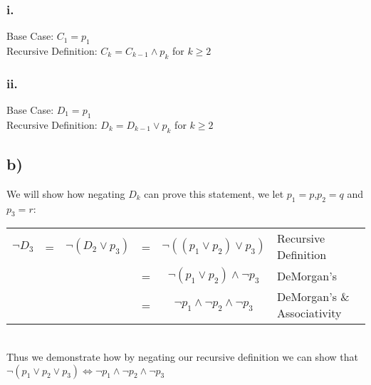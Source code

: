 \documentclass{article}
\begin{document}
\subsubsection*{i.}
Base Case: $C_1 = p_1$\\
Recursive Definition: $C_k = C_{k-1} \land p_k$ for $k\geq 2$
\subsubsection*{ii.}
Base Case: $D_1 = p_1$\\
Recursive Definition: $D_k = D_{k-1} \lor p_k$ for $k\geq 2$
\subsection*{b)}
We will show how negating $D_k$ can prove this statement, we let $p_1 = p$,$p_2 = q$ and $p_3 = r$: 

\begin{table}[ht]
    \centering
    \begin{tabular}{cccccl}
        $\lnot D_3$ & = & $\lnot(D_2 \lor p_3)$ & = & $\lnot((p_1 \lor p_2) \lor p_3)$ & Recursive Definition\\
         &  &  &   = & $\lnot(p_1 \lor p_2) \land \lnot p_3$& DeMorgan's\\
         &  &  & = & $\lnot p_1 \land 
         \lnot p_2 \land\lnot p_3$ & DeMorgan's \& Associativity\\
    \end{tabular}
\end{table} \\
Thus we demonstrate how by negating our recursive definition we can show that $\lnot(p_1 \lor p_2 \lor p_3) \Leftrightarrow \lnot p_1 \land \lnot p_2 \land \lnot p_3$
\end{document}

